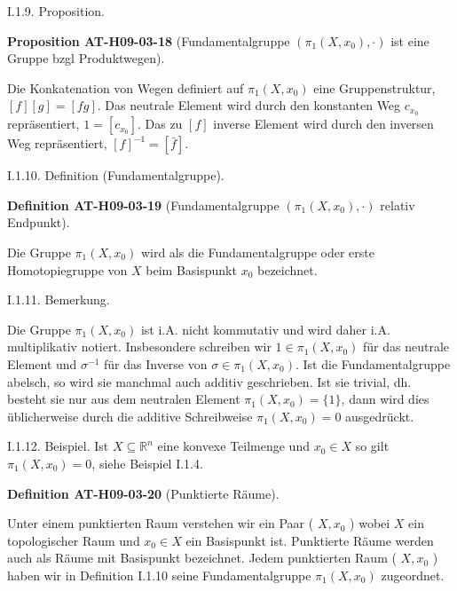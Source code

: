 \documentclass[10pt, letterpaper]{article}
\newcommand{\CustomHeading}[3]{%
  \par\medskip\noindent%
  \textbf{#1 #2} \textnormal{(#3)}.\enskip%
}
\newenvironment{DEF}[2]{\begin{unitbox}\CustomHeading{Definition}{#1}{#2}}{\end{unitbox}}
\newenvironment{PROP}[2]{\begin{unitbox}\CustomHeading{Proposition}{#1}{#2}}{\end{unitbox}}
\begin{document}
I.1.9. Proposition. 

\begin{PROP}{AT-H09-03-18}{Fundamentalgruppe $(\pi_1(X,x_0),\cdot)$ ist eine Gruppe bzgl Produktwegen}
Die Konkatenation von Wegen definiert auf $\pi_{1}\left(X, x_{0}\right)$ eine Gruppenstruktur, $[f][g]=[f g]$. Das neutrale Element wird durch den konstanten Weg $c_{x_{0}}$ repräsentiert, $1=\left[c_{x_{0}}\right]$. Das zu $[f]$ inverse Element wird durch den inversen Weg repräsentiert, $[f]^{-1}=[\bar{f}]$.
\end{PROP}



I.1.10. Definition (Fundamentalgruppe). 

\begin{DEF}{AT-H09-03-19}{Fundamentalgruppe $(\pi_1(X,x_0),\cdot)$ relativ Endpunkt}
Die Gruppe $\pi_{1}\left(X, x_{0}\right)$ wird als die Fundamentalgruppe oder erste Homotopiegruppe von $X$ beim Basispunkt $x_{0}$ bezeichnet.
\end{DEF}


I.1.11. Bemerkung. 

Die Gruppe $\pi_{1}\left(X, x_{0}\right)$ ist i.A. nicht kommutativ und wird daher i.A. multiplikativ notiert. Insbesondere schreiben wir $1 \in \pi_{1}\left(X, x_{0}\right)$ für das neutrale Element und $\sigma^{-1}$ für das Inverse von $\sigma \in \pi_{1}\left(X, x_{0}\right)$. Ist die Fundamentalgruppe abelsch, so wird sie manchmal auch additiv geschrieben. Ist sie trivial, dh. besteht sie nur aus dem neutralen Element $\pi_{1}\left(X, x_{0}\right)=\{1\}$, dann wird dies üblicherweise durch die additive Schreibweise $\pi_{1}\left(X, x_{0}\right)=0$ ausgedrückt.


I.1.12. Beispiel. Ist $X \subseteq \mathbb{R}^{n}$ eine konvexe Teilmenge und $x_{0} \in X$ so gilt $\pi_{1}\left(X, x_{0}\right)=0$, siehe Beispiel I.1.4.


\begin{DEF}{AT-H09-03-20}{Punktierte Räume}
Unter einem punktierten Raum verstehen wir ein Paar ( $X, x_{0}$ ) wobei $X$ ein topologischer Raum und $x_{0} \in X$ ein Basispunkt ist. Punktierte Räume werden auch als Räume mit Basispunkt bezeichnet. Jedem punktierten Raum ( $X, x_{0}$ ) haben wir in Definition I.1.10 seine Fundamentalgruppe $\pi_{1}\left(X, x_{0}\right)$ zugeordnet.
\end{DEF}
\end{document}
